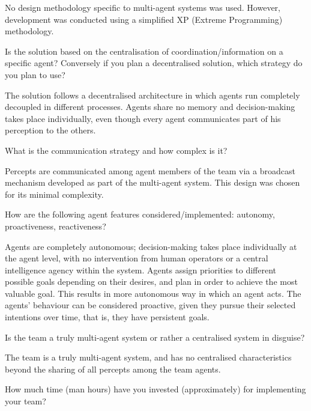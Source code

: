 No design methodology specific to multi-agent systems
was used. However, development was conducted using a simplified XP (Extreme
Programming) methodology. 

\begin{question}
Is the solution based on the centralisation of coordination/information on
a specific agent? Conversely if you plan a decentralised solution, which
strategy do you plan to use?  
\end{question}

The solution follows a decentralised architecture in which agents run completely 
decoupled in different processes. Agents share no memory and decision-making takes 
place individually, even though every agent communicates part of his perception 
to the others.

\begin{question}
What is the communication strategy and how complex is it?
\end{question}

Percepts are
communicated among agent members of the team via a broadcast mechanism
developed as part of the multi-agent system. This design was chosen for its
minimal complexity.

\begin{question}
How are the following agent features considered/implemented: autonomy,
proactiveness, reactiveness?  
\end{question}

Agents are completely autonomous;
decision-making takes place individually at the agent level, with no
intervention from human operators or a central intelligence agency within the
system. Agents assign priorities to different possible goals depending on
their desires, and plan in order to achieve the most valuable goal. This
results in more autonomous way in which an agent acts.
The agents' behaviour can be considered proactive, given they pursue their 
selected intentions over time, that is, they have persistent goals.

\begin{question}
Is the team a truly multi-agent system or rather a centralised system in
disguise?  
\end{question}

The team is a truly multi-agent system, and has no
centralised characteristics beyond the sharing of all percepts among the team agents.

\begin{question}
How much time (man hours) have you invested (approximately) for
implementing your team?  
\end{question}

